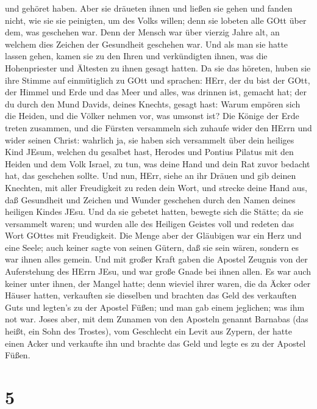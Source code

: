 und gehöret haben.  Aber sie dräueten ihnen und ließen sie
gehen und fanden nicht, wie sie sie peinigten, um des Volks willen; denn
sie lobeten alle GOtt über dem, was geschehen war.  Denn
der Mensch war über vierzig Jahre alt, an welchem dies Zeichen der
Gesundheit geschehen war.  Und als man sie hatte lassen
gehen, kamen sie zu den Ihren und verkündigten ihnen, was die
Hohenpriester und Ältesten zu ihnen gesagt hatten.  Da sie
das höreten, huben sie ihre Stimme auf einmütiglich zu GOtt und
sprachen: HErr, der du bist der GOtt, der Himmel und Erde und das Meer
und alles, was drinnen ist, gemacht hat;  der du durch den
Mund Davids, deines Knechts, gesagt hast: Warum empören sich die Heiden,
und die Völker nehmen vor, was umsonst ist?  Die Könige der
Erde treten zusammen, und die Fürsten versammeln sich zuhaufe wider den
HErrn und wider seinen Christ:  wahrlich ja, sie haben sich
versammelt über dein heiliges Kind JEsum, welchen du gesalbet hast,
Herodes und Pontius Pilatus mit den Heiden und dem Volk Israel,
 zu tun, was deine Hand und dein Rat zuvor bedacht hat, das
geschehen sollte.  Und nun, HErr, siehe an ihr Dräuen und
gib deinen Knechten, mit aller Freudigkeit zu reden dein Wort,
 und strecke deine Hand aus, daß Gesundheit und Zeichen und
Wunder geschehen durch den Namen deines heiligen Kindes JEsu.
 Und da sie gebetet hatten, bewegte sich die Stätte; da sie
versammelt waren; und wurden alle des Heiligen Geistes voll und redeten
das Wort GOttes mit Freudigkeit.  Die Menge aber der
Gläubigen war ein Herz und eine Seele; auch keiner sagte von seinen
Gütern, daß sie sein wären, sondern es war ihnen alles gemein.
 Und mit großer Kraft gaben die Apostel Zeugnis von der
Auferstehung des HErrn JEsu, und war große Gnade bei ihnen allen.
 Es war auch keiner unter ihnen, der Mangel hatte; denn
wieviel ihrer waren, die da Äcker oder Häuser hatten, verkauften sie
dieselben und brachten das Geld des verkauften Guts  und
legten's zu der Apostel Füßen; und man gab einem jeglichen; was ihm not
war.  Joses aber, mit dem Zunamen von den Aposteln genannt
Barnabas (das heißt, ein Sohn des Trostes), vom Geschlecht ein Levit aus
Zypern,  der hatte einen Acker und verkaufte ihn und
brachte das Geld und legte es zu der Apostel Füßen.

\hypertarget{section-4}{%
\section{5}\label{section-4}}

